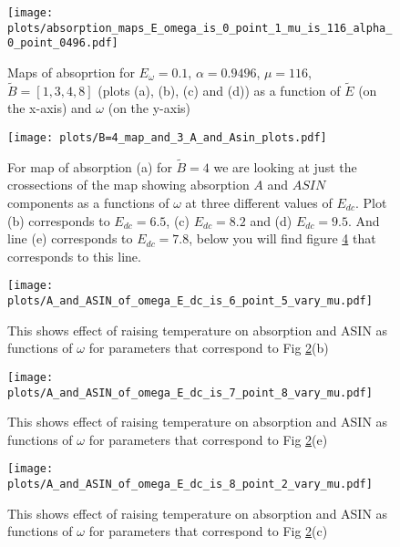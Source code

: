 \documentclass[40pt,letterpaper,physrev]{article}
\begin{document}
	\newpage	
	\begin{figure}[t]
	  \centering
	  \normalsize %
	  \texttt{[image: plots/absorption\_maps\_E\_omega\_is\_0\_point\_1\_mu\_is\_116\_alpha\_0\_point\_0496.pdf]}
	  \caption{Maps of absoprtion for $E_\omega=0.1$, $\alpha=0.9496$, $\mu=116$, $\tilde{B}=[1,3,4,8]$ 
	  (plots (a), (b), (c) and (d)) as a function of $\tilde{E}$ (on the x-axis) and $\omega$ (on the y-axis)}
	  \label{fig:absorption}	  
	\end{figure}	
	\begin{figure}[H]
	  \centering
	  \normalsize %
	  \texttt{[image: plots/B=4\_map\_and\_3\_A\_and\_Asin\_plots.pdf]}
	  \caption{For map of absorption (a) for $\tilde{B}=4$ we are looking at just the crossections of the
	  map showing absorption $A$ and $ASIN$ components as a functions of $\omega$ at three different values of $E_{dc}$.
	  Plot (b) corresponds to $E_{dc}=6.5$, (c) $E_{dc}=8.2$ and (d) $E_{dc}=9.5$. And line (e) corresponds to $E_{dc}=7.8$, 
	  below you will find figure \ref{fig:E_dc=7.8_B=4_different_mu} that corresponds to this line.}
	  \label{fig:map_of_absorption_and_profiles_for_three_different_E_dc_B=4}
	\end{figure}	
	\newpage	
	\begin{figure}[t]
	  \centering
	  \normalsize %
	  \texttt{[image: plots/A\_and\_ASIN\_of\_omega\_E\_dc\_is\_6\_point\_5\_vary\_mu.pdf]}
	  \caption{This shows effect of raising temperature on absorption and ASIN as functions of $\omega$ for parameters that 
	  correspond to Fig \ref{fig:map_of_absorption_and_profiles_for_three_different_E_dc_B=4}(b)}
	  \label{fig:E_dc=6.5_B=4_different_mu}	  
	\end{figure}
	\begin{figure}[H]
	  \centering
	  \normalsize %
	  \texttt{[image: plots/A\_and\_ASIN\_of\_omega\_E\_dc\_is\_7\_point\_8\_vary\_mu.pdf]}
	  \caption{This shows effect of raising temperature on absorption and ASIN as functions of $\omega$ for parameters that 
	  correspond to Fig \ref{fig:map_of_absorption_and_profiles_for_three_different_E_dc_B=4}(e)}
	  \label{fig:E_dc=7.8_B=4_different_mu}	  
	\end{figure}
	\newpage
	\begin{figure}[t]
	  \centering
	  \normalsize %
	  \texttt{[image: plots/A\_and\_ASIN\_of\_omega\_E\_dc\_is\_8\_point\_2\_vary\_mu.pdf]}
	  \caption{This shows effect of raising temperature on absorption and ASIN as functions of $\omega$ for parameters that 
	  correspond to Fig \ref{fig:map_of_absorption_and_profiles_for_three_different_E_dc_B=4}(c)}
	  \label{fig:E_dc=8.2_B=4_different_mu}	  
	\end{figure}
\end{document}
